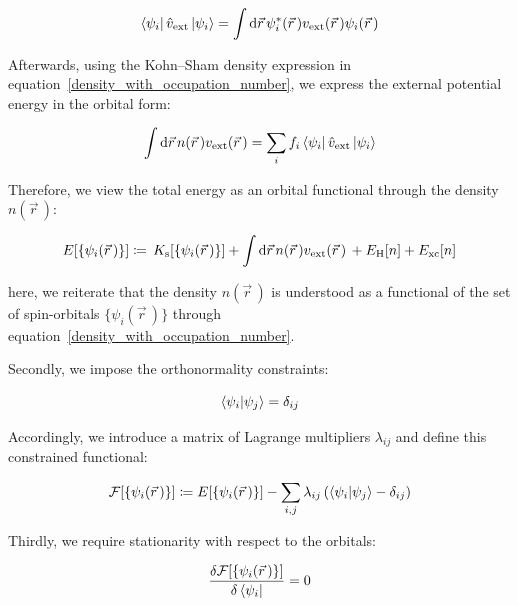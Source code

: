 \begin{equation}
    \bra{\psi_i}\hat{v}_\mathrm{ext}\ket{\psi_i}=
    \int\mathrm{d}{\vec{r}}\,
    \psi_i^\ast(\vec{r}\,)v_\mathrm{ext}(\vec{r}\,)\psi_i(\vec{r}\,)
\label{KS_external_operator_expectation_coordinate}
\end{equation}

Afterwards, using the Kohn--Sham density expression in equation~\eqref{density_with_occupation_number},
we express the external potential energy in the orbital form:

\begin{equation}
    \int\mathrm{d}{\vec{r}}\,n(\vec{r}\,)v_\mathrm{ext}(\vec{r}\,)
    = \sum_{i}f_{i}\bra{\psi_i}\hat{v}_\mathrm{ext}\ket{\psi_i}
\label{KS_external_energy_orbital_form}
\end{equation}

Therefore, we view the total energy as an orbital functional through the density $n(\vec{r}\,)$:

\begin{equation}
    E[\{\psi_i(\vec{r}\,)\}]\coloneqq
    \,K_\mathrm{s}[\{\psi_i(\vec{r}\,)\}]
    + \int \mathrm{d}{\vec{r}}\,
    n(\vec{r}\,)v_\mathrm{ext}(\vec{r}\,) 
    \,+ E_\mathrm{H}[n]
    + E_\mathrm{xc}[n]
\label{KS_total_energy_orbital_functional}
\end{equation}

here, we reiterate that the density $n(\vec{r}\,)$ is understood as a functional of the set of spin-orbitals $\{\psi_i(\vec{r}\,)\}$ through equation~\eqref{density_with_occupation_number}.

Secondly, we impose the orthonormality constraints:

\begin{equation}
    \braket{\psi_i|\psi_j}=\delta_{ij}
\label{KS_orbital_orthonormality}
\end{equation}

Accordingly, we introduce a matrix of Lagrange multipliers $\lambda_{ij}$ and define this constrained functional:

\begin{equation}
    \mathcal{F}[\{\psi_i(\vec{r}\,)\}]\coloneqq
    E[\{\psi_i(\vec{r}\,)\}]
    -\sum_{i,j}\lambda_{ij}\left(\braket{\psi_i|\psi_j}-\delta_{ij}\right)
\label{KS_constrained_functional_orbitals}
\end{equation}

Thirdly, we require stationarity with respect to the orbitals:

\begin{equation}
    \frac{\delta\mathcal{F}[\{\psi_i(\vec{r}\,)\}]}{\delta\bra{\psi_i}}=0
\label{KS_stationarity_condition_orbitals}
\end{equation}

